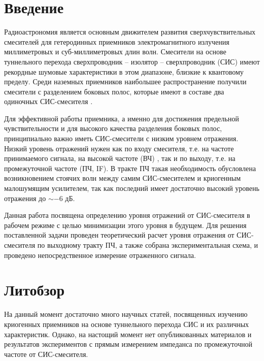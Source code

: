 \documentclass[a4paper]{article}
\begin{document}
\graphicspath{ {pictures/} }

\tableofcontents
\newpage

\section{Введение}

Радиоастрономия является основным движителем развития сверхчувствительных смесителей для гетеродинных приемников электромагнитного излучения 
миллиметровых и суб-миллиметровых длин волн. Смесители на основе туннельного перехода сверхпроводник – изолятор – сверхпроводник (СИС) \cite{Tucker} 
имеют рекордные шумовые характеристики в этом диапазоне, близкие к квантовому пределу. Среди наземных приемников наибольшее распространение получили 
смесители с разделением боковых полос, которые имеют в составе два одиночных СИС-смесителя \cite{Belitsky} \cite{Chenu}. 
\par

Для эффективной работы 
приемника, а именно для достижения предельной чувствительности и для высокого качества разделения боковых полос, принципиально важно иметь СИС-смесители 
с низким уровнем отражения. Низкий уровень отражений нужен как по входу смесителя, т.е. на частоте принимаемого сигнала, на высокой частоте (ВЧ) 
\cite{Hesper} \cite{Khudchenko}, так и по выходу, т.е. на промежуточной частоте (ПЧ, IF). В тракте ПЧ такая необходимость обусловлена возникновением 
стоячих волн между самим СИС-смесителем и криогенным малошумящим усилителем, так как последний имеет достаточно высокий уровень отражения до $\sim -6$ дБ.
\par

Данная работа посвящена определению уровня отражений от 
СИС-смесителя в рабочем режиме с целью минимизации этого уровня в будущем. Для решения поставленной задачи проведен теоретический расчет уровня 
отражения от СИС-смесителя по выходному тракту ПЧ, а также собрана экспериментальная схема, и проведено непосредственное измерение отраженного сигнала.



\section{Литобзор}

На данный момент достаточно много научных статей, посвященных изучению криогенных приемников на основе туннельного перехода СИС и их различных характеристик.
Однако, на настощий момент нет опубликованных материалов и результатов экспериментов с прямым измерением импеданса по промежуточной частоте от СИС-смесителя.
\end{document}
